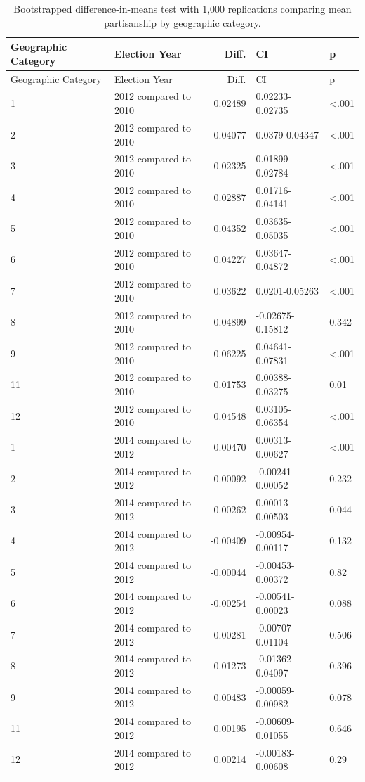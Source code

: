 \documentclass[10pt,]{article}
\begin{document}
\begin{longtable}[]{@{}llrll@{}}
\caption{Bootstrapped difference-in-means test with 1,000 replications
comparing mean partisanship by geographic category.}\tabularnewline
\toprule
Geographic Category & Election Year & Diff. & CI & p\tabularnewline
\midrule
\endfirsthead
\toprule
Geographic Category & Election Year & Diff. & CI & p\tabularnewline
\midrule
\endhead
1 & 2012 compared to 2010 & 0.02489 & 0.02233-0.02735 &
\textless.001\tabularnewline
2 & 2012 compared to 2010 & 0.04077 & 0.0379-0.04347 &
\textless.001\tabularnewline
3 & 2012 compared to 2010 & 0.02325 & 0.01899-0.02784 &
\textless.001\tabularnewline
4 & 2012 compared to 2010 & 0.02887 & 0.01716-0.04141 &
\textless.001\tabularnewline
5 & 2012 compared to 2010 & 0.04352 & 0.03635-0.05035 &
\textless.001\tabularnewline
6 & 2012 compared to 2010 & 0.04227 & 0.03647-0.04872 &
\textless.001\tabularnewline
7 & 2012 compared to 2010 & 0.03622 & 0.0201-0.05263 &
\textless.001\tabularnewline
8 & 2012 compared to 2010 & 0.04899 & -0.02675-0.15812 &
0.342\tabularnewline
9 & 2012 compared to 2010 & 0.06225 & 0.04641-0.07831 &
\textless.001\tabularnewline
11 & 2012 compared to 2010 & 0.01753 & 0.00388-0.03275 &
0.01\tabularnewline
12 & 2012 compared to 2010 & 0.04548 & 0.03105-0.06354 &
\textless.001\tabularnewline
1 & 2014 compared to 2012 & 0.00470 & 0.00313-0.00627 &
\textless.001\tabularnewline
2 & 2014 compared to 2012 & -0.00092 & -0.00241-0.00052 &
0.232\tabularnewline
3 & 2014 compared to 2012 & 0.00262 & 0.00013-0.00503 &
0.044\tabularnewline
4 & 2014 compared to 2012 & -0.00409 & -0.00954-0.00117 &
0.132\tabularnewline
5 & 2014 compared to 2012 & -0.00044 & -0.00453-0.00372 &
0.82\tabularnewline
6 & 2014 compared to 2012 & -0.00254 & -0.00541-0.00023 &
0.088\tabularnewline
7 & 2014 compared to 2012 & 0.00281 & -0.00707-0.01104 &
0.506\tabularnewline
8 & 2014 compared to 2012 & 0.01273 & -0.01362-0.04097 &
0.396\tabularnewline
9 & 2014 compared to 2012 & 0.00483 & -0.00059-0.00982 &
0.078\tabularnewline
11 & 2014 compared to 2012 & 0.00195 & -0.00609-0.01055 &
0.646\tabularnewline
12 & 2014 compared to 2012 & 0.00214 & -0.00183-0.00608 &
0.29\tabularnewline
\bottomrule
\end{longtable}
\end{document}
